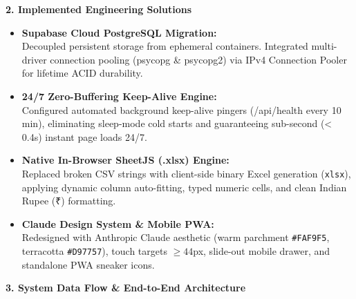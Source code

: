 \documentclass[a4paper,10pt]{article}
\begin{document}
\begin{minipage}[t]{0.485\textwidth}
    {\small \textbf{\color{soleterracotta} 2. Implemented Engineering Solutions}}
    \vspace{1pt}
    
    \begin{itemize}[leftmargin=*, itemsep=2.0pt, topsep=1pt]
        \item \footnotesize \textbf{Supabase Cloud PostgreSQL Migration:}\\
        Decoupled persistent storage from ephemeral containers. Integrated multi-driver connection pooling (psycopg \& psycopg2) via IPv4 Connection Pooler for lifetime ACID durability.
        
        \item \footnotesize \textbf{24/7 Zero-Buffering Keep-Alive Engine:}\\
        Configured automated background keep-alive pingers (/api/health every 10 min), eliminating sleep-mode cold starts and guaranteeing sub-second (< 0.4s) instant page loads 24/7.
        
        \item \footnotesize \textbf{Native In-Browser SheetJS (.xlsx) Engine:}\\
        Replaced broken CSV strings with client-side binary Excel generation (\texttt{xlsx}), applying dynamic column auto-fitting, typed numeric cells, and clean Indian Rupee (₹) formatting.
        
        \item \footnotesize \textbf{Claude Design System \& Mobile PWA:}\\
        Redesigned with Anthropic Claude aesthetic (warm parchment \texttt{\#FAF9F5}, terracotta \texttt{\#D97757}), touch targets $\ge 44$px, slide-out mobile drawer, and standalone PWA sneaker icons.
    \end{itemize}
\end{minipage}

\vspace{3pt}

{\small \textbf{\color{soleterracotta} 3. System Data Flow \& End-to-End Architecture}}
\vspace{1pt}
\end{document}
